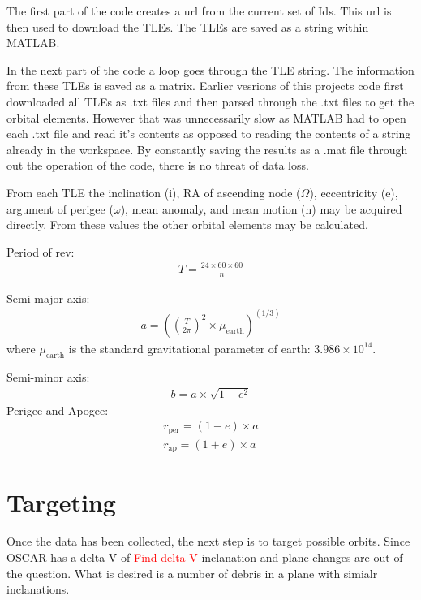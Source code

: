 \documentclass[12pt]{report}
\begin{document}
		The first part of the code creates a url from the current set of Ids. This url is then used to download the TLEs. The TLEs are saved as a string within MATLAB.  
		
		In the next part of the code a loop goes through the TLE string. The information from these TLEs is saved as a matrix. Earlier vesrions of this projects code first downloaded all TLEs as .txt files and then parsed through the .txt files to get the orbital elements. However that was unnecessarily slow as MATLAB had to open each .txt file and read it's contents as opposed to reading the contents of a string already in the workspace. By constantly saving the results as a .mat file through out the operation of the code, there is no threat of data loss. 
		
			
		
		From each TLE the inclination (i), RA of ascending node ($\Omega$), eccentricity (e), argument of perigee ($\omega$), mean anomaly, and mean motion (n) may be acquired directly. From these values the other orbital elements may be calculated. 
		
		Period of rev:
		\begin{align}
		T=\frac{24\times60\times60}{n}
		\end{align}
		
		Semi-major axis:
		\begin{align}
		a=\left(\left(\frac{T}{2\pi}\right)^2 \times \mu_\text{earth}\right)^{(1/3)}
		\end{align}
		where $\mu_\text{earth}$ is the standard gravitational parameter of earth: $3.986\times10^{14}$. 
		
		Semi-minor axis:
		\begin{align}
		b=a\times\sqrt{1-e^2}
		\end{align}
		Perigee and Apogee:
		\begin{align}
		r_\text{per}=\left(1-e\right)\times a\\
		r_\text{ap}=\left(1+e\right)\times a
		\end{align}
		
		
		
		\section{Targeting}
		Once the data has been collected, the next step is to target possible orbits. Since OSCAR has a delta V of \textcolor{red}{Find delta V} inclanation and plane changes are out of the question. What is desired is a number of debris in a plane with simialr inclanations.
		
\end{document}
